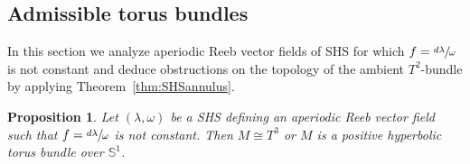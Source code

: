 \documentclass[10pt]{amsart}
\newtheorem{prop}[theorem]{Proposition}
\theoremstyle{definition}
\newcommand{\mS}{\mathbb{S}}
\begin{document}
\subsection{Admissible torus bundles}

In this section we analyze aperiodic Reeb vector fields of SHS for which $f=\sfrac{d\lambda}{\omega}$ is not constant and deduce obstructions on the topology of the ambient $T^2$-bundle by applying Theorem~\ref{thm:SHSannulus}.

\begin{prop}\label{prop:bundles}
Let $(\lambda, \omega)$ be a SHS defining an aperiodic Reeb vector field such that $f=\sfrac{d\lambda}{\omega}$ is not constant. Then $M\cong T^3$ or $M$ is a positive hyperbolic torus bundle over $\mS^1$.
\end{prop}
\end{document}
